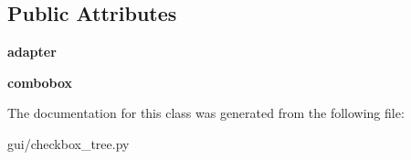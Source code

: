 \subsection*{Public Attributes}
\begin{DoxyCompactItemize}
\item 
\mbox{\label{classgui_1_1checkbox__tree_1_1_combobox_tree_item_delegate_ae52517741f260f0cf1f3839a8049eaf8}} 
{\bfseries adapter}
\item 
\mbox{\label{classgui_1_1checkbox__tree_1_1_combobox_tree_item_delegate_a5a2eafaf182ee52903315d09094dc6ef}} 
{\bfseries combobox}
\end{DoxyCompactItemize}


The documentation for this class was generated from the following file\+:\begin{DoxyCompactItemize}
\item 
gui/checkbox\+\_\+tree.\+py\end{DoxyCompactItemize}
